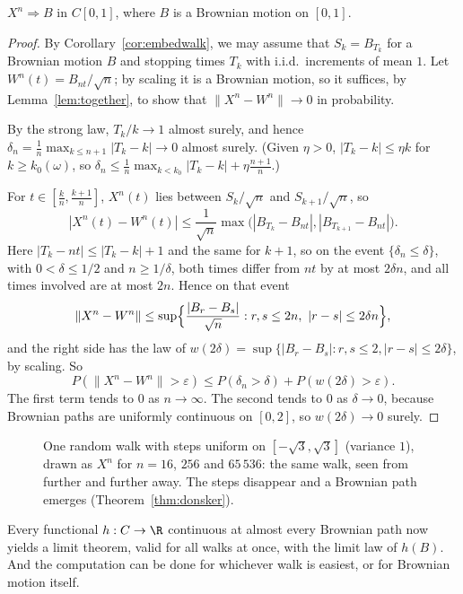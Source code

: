 \begin{theorem}\label{thm:donsker}
$X^n\Rightarrow B$ in $C[0,1]$, where $B$ is a Brownian motion on $[0,1]$.
\end{theorem}
\begin{proof}
By Corollary~\ref{cor:embedwalk}, we may assume that $S_k=B_{T_k}$ for a Brownian motion $B$ and stopping times $T_k$ with i.i.d.\ increments of mean $1$. Let
$W^n(t)=B_{nt}/\sqrt n$; by scaling it is a Brownian motion, so it suffices, by Lemma~\ref{lem:together}, to show that $\|X^n-W^n\|\to0$ in probability.

By the strong law, $T_k/k\to1$ almost surely, and hence $\delta_n=\frac1n\max_{k\le n+1}|T_k-k|\to0$ almost surely. (Given $\eta>0$, $|T_k-k|\le\eta k$ for $k\ge k_0(\omega)$, so
$\delta_n\le\frac1n\max_{k<k_0}|T_k-k|+\eta\frac{n+1}n$.)

For $t\in[\frac kn,\frac{k+1}n]$, $X^n(t)$ lies between $S_k/\sqrt n$ and $S_{k+1}/\sqrt n$, so
\[
|X^n(t)-W^n(t)|\le\frac1{\sqrt n}\max\bigl(|B_{T_k}-B_{nt}|,|B_{T_{k+1}}-B_{nt}|\bigr).
\]
Here $|T_k-nt|\le|T_k-k|+1$ and the same for $k+1$, so on the event $\{\delta_n\le\delta\}$, with $0<\delta\le1/2$ and $n\ge1/\delta$, both times differ from $nt$ by at most $2\delta n$, and all
times involved are at most $2n$. Hence on that event
\[
\|X^n-W^n\|\le\sup\Bigl\{\frac{|B_r-B_s|}{\sqrt n}:r,s\le2n,\ |r-s|\le2\delta n\Bigr\},
\]
and the right side has the law of $w(2\delta)=\sup\{|B_r-B_s|:r,s\le2,|r-s|\le2\delta\}$, by scaling. So
\[
P(\|X^n-W^n\|>\varepsilon)\le P(\delta_n>\delta)+P(w(2\delta)>\varepsilon).
\]
The first term tends to $0$ as $n\to\infty$. The second tends to $0$ as $\delta\to0$, because Brownian paths are uniformly continuous on $[0,2]$, so $w(2\delta)\to0$ surely.
\end{proof}

\begin{figure}[ht]
\centering{}
\caption{One random walk with steps uniform on $[-\sqrt3,\sqrt3]$ (variance $1$), drawn as $X^n$ for $n=16$, $256$ and $65\,536$: the same walk, seen from further and
further away. The steps disappear and a Brownian path emerges (Theorem~\ref{thm:donsker}).}
\label{fig:donsker}
\end{figure}

Every functional $h:C\to\R$ continuous at almost every Brownian path now yields a limit theorem, valid for all walks at once, with the limit law of $h(B)$. And the
computation can be done for whichever walk is easiest, or for Brownian motion itself.

